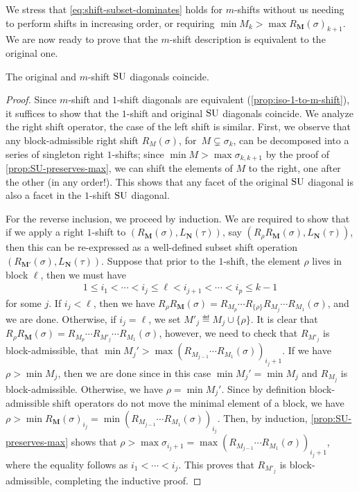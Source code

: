 We stress that \cref{eq:shift-subset-dominates} holds for $m$-shifts without us needing to perform shifts in increasing order, or requiring $\min M_k > \max R_{\mathbf{M}}(\sigma)_{k+1}$.
We are now ready to prove that the $m$-shift description is equivalent to the original one. 

\begin{theorem}
\label{prop:iso-original-shift-diagonals}
The original and $m$-shift $\mathrm{SU}$ diagonals coincide.
\end{theorem}

\begin{proof}
Since $m$-shift and $1$-shift diagonals are equivalent (\cref{prop:iso-1-to-m-shift}), it suffices to show that the $1$-shift and original $\mathrm{SU}$ diagonals coincide. 
We analyze the right shift operator, the case of the left shift is similar. 
First, we observe that any block-admissible right shift $R_{M}(\sigma)$, for~$M\subsetneq\sigma_k$, can be decomposed into a series of singleton right $1$-shifts; since $\min M > \max \sigma_{k,k+1}$ by the proof of \cref{prop:SU-preserves-max}, we can shift the elements of $M$ to the right, one after the other (in any order!).
This shows that any facet of the original $\mathrm{SU}$ diagonal is also a facet in the $1$-shift $\mathrm{SU}$ diagonal.

For the reverse inclusion, we proceed by induction. 
We are required to show that if we apply a right $1$-shift to $(R_{\mathbf{M}}(\sigma),L_{\mathbf{N}}(\tau))$, say $(R_{\rho}R_{\mathbf{M}}(\sigma),L_{\mathbf{N}}(\tau))$, then this can be re-expressed as a well-defined subset shift operation $(R_{\mathbf{M'}}(\sigma),L_{\mathbf{N}}(\tau))$. 
Suppose that prior to the $1$-shift, the element $\rho$ lives in block $\ell$, then we must have
\begin{align*}
1 \leq i_1 < \cdots < i_j \leq \ell < i_{j+1} <\cdots< i_p \leq k-1
\end{align*}
for some $j$. 
If $i_j < \ell$, then we have $R_{\rho}R_{\mathbf{M}}(\sigma) = R_{M_{p}}\cdots R_{\{\rho\}}R_{M_{j}}\cdots R_{M_{1}}(\sigma)$, and we are done.
Otherwise, if $i_j = \ell$, we set $M'_{j} \eqdef M_{j} \cup \{\rho \}$. 
It is clear that ${R_{\rho}R_{\mathbf{M}}(\sigma) = R_{M_{p}}\cdots R_{M'_{j}}\cdots R_{M_{1}}(\sigma)}$, however, we need to check that $R_{M'_{j}}$ is block-admissible, \ie that $\min M_{j}' > \max (R_{M_{j-1}}\cdots R_{M_{1}}(\sigma))_{i_j+1}$.
If we have~$\rho > \min M_{j}$, then we are done since in this case $\min M_{j}'=\min M_{j}$ and $R_{M_{j}}$ is block-admissible.
Otherwise, we have $\rho=\min M_{j}'$. 
Since by definition block-admissible shift operators do not move the minimal element of a block, we have $\rho > \min R_{\mathbf{M}}(\sigma)_{i_j}= \min (R_{M_{j-1}}\cdots R_{M_{1}}(\sigma))_{i_j}$.
Then, by induction, \cref{prop:SU-preserves-max} shows that $\rho>\max \sigma_{i_j+1} = \max (R_{M_{j-1}}\cdots R_{M_{1}}(\sigma))_{i_j + 1}$, where the equality follows as $i_1<\cdots<i_j$. 
This proves that $R_{M'_{j}}$ is block-admissible, completing the inductive proof.
\end{proof}

